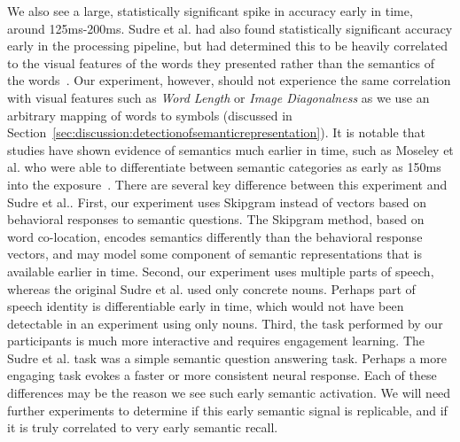 We also see a large, statistically significant spike in \tvt accuracy early in 
time, around 125ms-200ms. Sudre et al. had also found statistically significant 
accuracy early in the processing pipeline, but had determined this to be 
heavily correlated to the visual features of the words they presented rather 
than the semantics of the words~\cite{Sudre2012}. Our experiment, however, 
should not experience the same correlation with visual features such as 
\emph{Word Length} or \emph{Image Diagonalness} as we use an arbitrary mapping 
of words to symbols (discussed in 
Section~\ref{sec:discussion:detectionofsemanticrepresentation}). It is notable 
that studies have shown evidence of semantics much earlier in time, such as 
Moseley et al. who were able to differentiate between semantic categories as 
early as 150ms into the exposure~\cite{moseley2013sensorimotor}. There are 
several key difference between this experiment and Sudre et al..  First, our 
experiment uses Skipgram instead of vectors based on behavioral responses to 
semantic questions. The Skipgram method, based on word co-location, encodes 
semantics differently than the behavioral response vectors, and may model some 
component of semantic representations that is available earlier in time.  
Second, our experiment uses multiple parts of speech, whereas the original 
Sudre et al. used only concrete nouns.  Perhaps part of speech identity is 
differentiable early in time, which would not have been detectable in an 
experiment using only nouns.  Third, the task performed by our participants is 
much more interactive and requires engagement learning.  The Sudre et al. task 
was a simple semantic question answering task. Perhaps a more engaging task 
evokes a faster or more consistent neural response.  Each of these differences 
may be the reason we see such early semantic activation.  We will need further 
experiments to determine if this early semantic signal is replicable, and if it 
is truly correlated to very early semantic recall.
